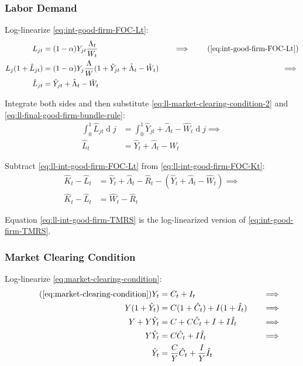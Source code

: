 \documentclass[
	12pt,
	]{article}
\numberwithin{equation}{section}
\DeclareMathOperator{\dif}{d}
\theoremstyle{definition}
\theoremstyle{plain}
\theoremstyle{plain}
\theoremstyle{plain}
\begin{document}

\subsubsection{Labor Demand}

Log-linearize \ref{eq:int-good-firm-FOC-Lt}:
\begin{alignat}{2}
	L_{jt} &= (1-\alpha) Y_{jt} \frac{\Lambda_t}{W_t} &\implies \tag{\ref{eq:int-good-firm-FOC-Lt}} \\
	L_j (1+ \hat{L}_{jt}) &= (1-\alpha) Y_{j} \frac{\Lambda}{W} (1+ \hat{Y}_{jt} +\hat{\Lambda}_t -\hat{W}_t) \quad &\implies \nonumber \\
	\hat{L}_{jt} &= \hat{Y}_{jt} +\hat{\Lambda}_t -\hat{W}_t \nonumber
\end{alignat}

Integrate both sides and then substitute \ref{eq:ll-market-clearing-condition-2} and \ref{eq:ll-final-good-firm-bundle-rule}:
\begin{align}
	\int_{0}^{1} \hat{L}_{jt} \dif j &= \int_{0}^{1} \hat{Y}_{jt} + \hat{\Lambda}_t - \hat{W}_t \dif j \implies \nonumber \\
	\hat{L}_t &= \hat{Y}_t + \hat{\Lambda}_t - \hat{W}_t
	\label{eq:ll-int-good-firm-FOC-Lt}
\end{align}

Subtract \ref{eq:ll-int-good-firm-FOC-Lt} from \ref{eq:ll-int-good-firm-FOC-Kt}:
\begin{align}
	\hat{K}_t - \hat{L}_t &= \hat{Y}_t + \hat{\Lambda}_t - \hat{R}_t - (\hat{Y}_t + \hat{\Lambda}_t - \hat{W}_t) \implies \nonumber \\
	\hat{K}_t - \hat{L}_t &= \hat{W}_t - \hat{R}_t \label{eq:ll-int-good-firm-TMRS}
\end{align}

Equation \ref{eq:ll-int-good-firm-TMRS} is the log-linearized version of \ref{eq:int-good-firm-TMRS}.


\subsubsection{Market Clearing Condition}

Log-linearize \ref{eq:market-clearing-condition}:
\begin{alignat}{2}
\tag{\ref{eq:market-clearing-condition}}
	Y_t &= C_t + I_t &\implies \\
	Y (1+ \hat{Y}_t) &= C(1+ \hat{C}_t) + I (1+ \hat{I}_t) \quad &\implies \nonumber \\
	Y + Y\hat{Y}_t &= C + C\hat{C}_t + I + I\hat{I}_t &\implies \nonumber  \\
	Y\hat{Y}_t &= C\hat{C}_t + I\hat{I}_t &\implies \nonumber \\
	\hat{Y}_t &= \frac{C}{Y}\hat{C}_t + \frac{I}{Y}\hat{I}_t  \label{eq:ll-market-clearing-condition}
\end{alignat}
\end{document}
